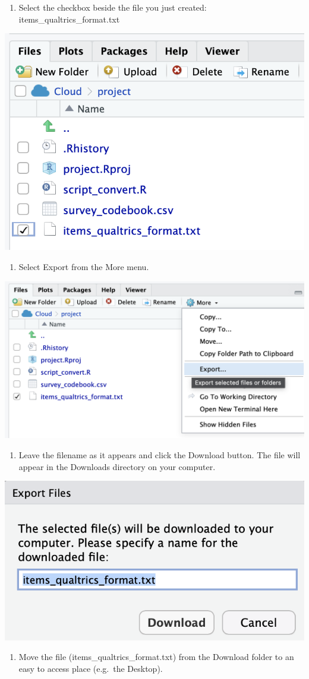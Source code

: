 \documentclass[
]{krantz}
\providecommand{\tightlist}{%
  \setlength{\itemsep}{0pt}\setlength{\parskip}{0pt}}
\begin{document}
\begin{enumerate}
\def\labelenumi{\arabic{enumi}.}
\setcounter{enumi}{8}
\tightlist
\item
  Select the checkbox beside the file you just created: items\_qualtrics\_format.txt
\end{enumerate}

\includegraphics[width=0.35\linewidth]{ch_qualtrics/images/screenshot_select_export_file}

\begin{enumerate}
\def\labelenumi{\arabic{enumi}.}
\setcounter{enumi}{9}
\tightlist
\item
  Select Export from the More menu.
\end{enumerate}

\includegraphics[width=0.6\linewidth]{ch_qualtrics/images/screenshot_select_export_menu}

\begin{enumerate}
\def\labelenumi{\arabic{enumi}.}
\setcounter{enumi}{10}
\tightlist
\item
  Leave the filename as it appears and click the Download button. The file will appear in the Downloads directory on your computer.
\end{enumerate}

\includegraphics[width=0.4\linewidth]{ch_qualtrics/images/screenshot_export_filename}

\begin{enumerate}
\def\labelenumi{\arabic{enumi}.}
\setcounter{enumi}{11}
\tightlist
\item
  Move the file (items\_qualtrics\_format.txt) from the Download folder to an easy to access place (e.g.~the Desktop).
\end{enumerate}
\end{document}
